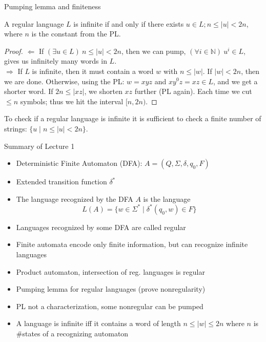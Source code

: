 \documentclass[handout]{beamer}
\begin{document}
\begin{frame}{Pumping lemma and finiteness}
	
	\begin{theorem}
	A regular language $L$ is infinite if and only if there exists $u\in L; n\leq |u|<2n$, where $n$ is the constant from the PL.
	\end{theorem}
	\begin{proof}
        \alert{\Large$\Leftarrow$} If $(\exists u\in L)\ n\leq |u|<2n$, then we can pump, $(\forall i \in \mathbb{N})\ u^i \in L$, gives us infinitely many words in $L$.\\	
        \alert{\Large$\Rightarrow$} If $L$ is infinite, then it must contain a word $w$ with $n\leq |w|$. If $|w|<2n$, then we are done. Otherwise, using the PL: $w=xyz$ and $x{y^0}z=xz\in L$, and we get a shorter word. If $2n\leq |xz|$, we shorten  $xz$  further (PL again). Each time we cut $\leq n$ symbols; thus we hit the interval $[n,2n)$.
	\end{proof}
	
	\begin{corollary}To check if a regular language is infinite it is sufficient to check a finite number of strings:  $\{u\mid n\leq |u|<2n\}$.
	\end{corollary}

\end{frame}


\begin{frame}{Summary of Lecture 1}

    \begin{itemize}
        \item  \alert{Deterministic Finite Automaton (DFA)}: $A=(Q,\Sigma,\delta,q_0,F)$
        \item Extended transition function $\delta^*$
        \item The language \alert{recognized} by the DFA $A$ is the language 
        $$
        L(A)=\{w\in \Sigma^* \mid \delta^*(q_0,w)\in F\}
        $$    
        \item Languages recognized by some DFA are called \alert{regular}
        \item Finite automata encode only finite information, but can recognize infinite languages
        \item Product automaton, intersection of reg. languages is regular   
        \item \alert{Pumping lemma for regular languages} (prove nonregularity)
        \item PL not a characterization, some nonregular can be pumped
        \item A language is infinite iff it contains a word of length $n\leq |w|\leq 2n$ where $n$ is \#states of a recognizing automaton
    \end{itemize}

\end{frame}
\end{document}
